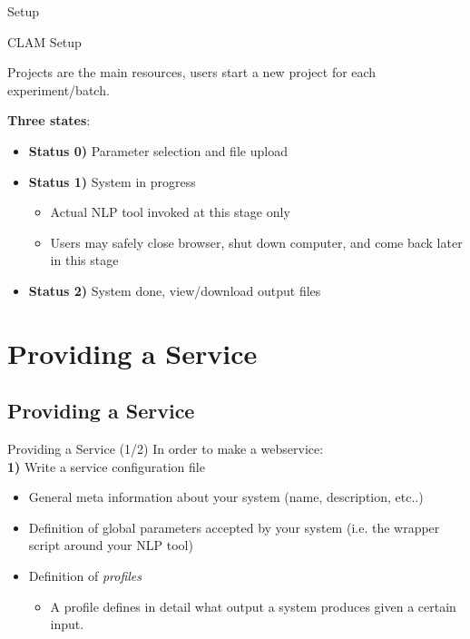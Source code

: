 \documentclass[compress]{beamer}
\begin{document}
\begin{frame}{Setup}
    \begin{block}{CLAM Setup}

            Projects are the main resources, users start a new project for each experiment/batch.
    
            \textbf{Three states}:

            \begin{itemize}
                \item \textbf{Status 0)} Parameter selection and file upload
                \item \textbf{Status 1)} System in progress
                \begin{itemize}
                    \item Actual NLP tool invoked at this stage only
                    \item Users may safely close browser, shut down computer, and come back later in this stage
                \end{itemize}
                \item \textbf{Status 2)} System done, view/download output files
            \end{itemize}


    \end{block}
\end{frame}

\section{Providing a Service}

\subsection{Providing a Service}

\begin{frame}
    \begin{block}{Providing a Service (1/2)}
        In order to make a webservice: \\       
        \textbf{1)} Write a service configuration file
        \begin{itemize}
            \item General meta information about your system {\footnotesize{(name, description, etc..)}}
            \item Definition of global parameters accepted by your system {\footnotesize{(i.e. the wrapper script around your NLP tool)}}
            \item Definition of \emph{profiles}
            \begin{itemize}
                \item A profile defines in detail what output a system produces given a certain input.                    
            \end{itemize}
        \end{itemize}    
    
    \end{block}

\end{frame}            
\end{document}
